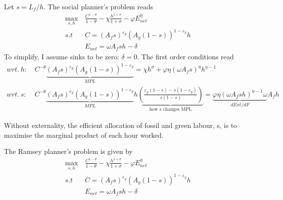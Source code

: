 Let $s=L_f/h$. The social planner's problem reads
\begin{align}
\underset{s, h}{\max}\ & \frac{C^{1-\theta}}{1-\theta}-\chi \frac{h^{1+\sigma}}{1+\sigma}-\varphi E_{net}^{\eta}\\
s.t\ \ & C=\left(A_fs\right)^{\varepsilon_y}\left(A_g(1-s)\right)^{1-\varepsilon_y}h\\
& E_{net}=\omega A_fsh-\delta
\end{align}
To simplify, I assume sinks to be zero: $\delta=0$.
The first order conditions read
\begin{align}
wrt.\ h:\ & C^{-\theta}\underbrace{(A_fs)^{\varepsilon_y}(A_g(1-s))^{1-\varepsilon_y}}_{MPL}=\chi h^\sigma+\varphi \eta (\omega A_f s)^\eta h^{\eta-1}\\
wrt.\ s:\ & C^{-\theta}\underbrace{(A_fs)^{\varepsilon_y}(A_g(1-s))^{1-\varepsilon_y}}_{MPL}h\underbrace{\left(\frac{\varepsilon_y(1-s)-s(1-\varepsilon_y)}{s(1-s)}\right)}_{\text{how s changes MPL}}=\underbrace{\varphi \eta (\omega A_f s h)^{\eta-1}\omega }_{dExt/dF} A_f h
\end{align}

Without externality, the efficient allocation of fossil and green labour, s, is to maximise the marginal product of each hour worked.

The Ramsey planner's problem is given by
\begin{align}
\underset{s, h}{\max}\ & \frac{C^{1-\theta}}{1-\theta}-\chi \frac{h^{1+\sigma}}{1+\sigma}-\varphi E_{net}^{\eta}\\
s.t\ \ & C=\left(A_fs\right)^{\varepsilon_y}\left(A_g(1-s)\right)^{1-\varepsilon_y}h\\
& E_{net}=\omega A_fsh-\delta
\end{align}
